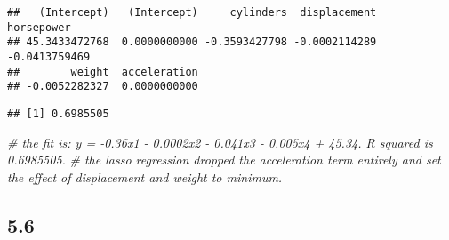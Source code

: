 \documentclass[
]{article}
\newenvironment{Shaded}{\begin{snugshade}}{\end{snugshade}}
\newcommand{\CommentTok}[1]{\textcolor[rgb]{0.56,0.35,0.01}{\textit{#1}}}
\newcommand{\DecValTok}[1]{\textcolor[rgb]{0.00,0.00,0.81}{#1}}
\newcommand{\KeywordTok}[1]{\textcolor[rgb]{0.13,0.29,0.53}{\textbf{#1}}}
\newcommand{\NormalTok}[1]{#1}
\newcommand{\OperatorTok}[1]{\textcolor[rgb]{0.81,0.36,0.00}{\textbf{#1}}}
\newcommand{\StringTok}[1]{\textcolor[rgb]{0.31,0.60,0.02}{#1}}
\begin{document}
\begin{verbatim}
##   (Intercept)   (Intercept)     cylinders  displacement    horsepower 
## 45.3433472768  0.0000000000 -0.3593427798 -0.0002114289 -0.0413759469 
##        weight  acceleration 
## -0.0052282327  0.0000000000
\end{verbatim}

\begin{Shaded}
\end{Shaded}

\begin{verbatim}
## [1] 0.6985505
\end{verbatim}

\begin{Shaded}
\begin{Highlighting}[]
\CommentTok{# the fit is: y = -0.36x1 - 0.0002x2 - 0.041x3 - 0.005x4 + 45.34. R squared is 0.6985505.}
\CommentTok{# the lasso regression dropped the acceleration term entirely and set the effect of displacement and weight to minimum.}
\end{Highlighting}
\end{Shaded}

\hypertarget{section-3}{%
\subsection{5.6}\label{section-3}}
\end{document}
